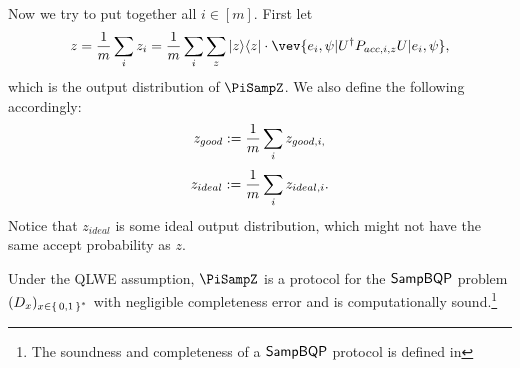 Now we try to put together all $i\in [m]$. First let
$$z=\frac{1}{m} \sum_i z_i= \frac{1}{m} \sum_i \sum_z \proj{z} \cdot \vev{e_i,\psi|U^\dag P_{acc,i,z} U|e_i,\psi},$$
which is the output distribution of $\PiSampZ$.
We also define the following accordingly:
$$z_{good}:= \frac{1}{m}\sum_i z_{good,i,}$$
$$z_{ideal}:= \frac{1}{m}\sum_i z_{ideal,i}.$$
Notice that $z_{ideal}$ is some ideal output distribution, which might not have the same accept probability as $z$.




\begin{theorem}\label{thm:qpip0} 
	Under the QLWE assumption, $\PiSampZ$ is a protocol for the $\operatorname{\mathsf{SampBQP}}$ problem $(D_x)_{x\in\set{0,1}^*}$  with negligible completeness error and is computationally sound.\footnote{The soundness and completeness of a $\operatorname{\mathsf{SampBQP}}$ protocol is defined in }
	
	
\end{theorem}
